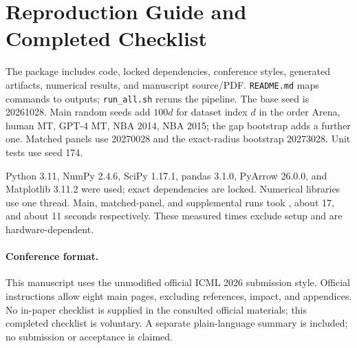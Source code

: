 \documentclass{article}
\begin{document}
\section{Reproduction Guide and Completed Checklist}\label{app:repro}
The package includes code, locked dependencies, conference styles, generated artifacts, numerical results, and manuscript source/PDF. \texttt{README.md} maps commands to outputs; \texttt{run\_all.sh} reruns the pipeline. The base seed is 20261028. Main random seeds add $100d$ for dataset index $d$ in the order Arena, human MT, GPT-4 MT, NBA 2014, NBA 2015; the gap bootstrap adds a further one. Matched panels use 20270028 and the exact-radius bootstrap 20273028. Unit tests use seed 174.

Python 3.11, NumPy 2.4.6, SciPy 1.17.1, pandas 3.1.0, PyArrow 26.0.0, and Matplotlib 3.11.2 were used; exact dependencies are locked. Numerical libraries use one thread. Main, matched-panel, and supplemental runs took \MainRuntime{}, about 17, and about 11 seconds respectively. These measured times exclude setup and are hardware-dependent.

\paragraph{Conference format.}
This manuscript uses the unmodified official ICML 2026 submission style. Official instructions allow eight main pages, excluding references, impact, and appendices. No in-paper checklist is supplied in the consulted official materials; this completed checklist is voluntary. A separate plain-language summary is included; no submission or acceptance is claimed.
\end{document}
